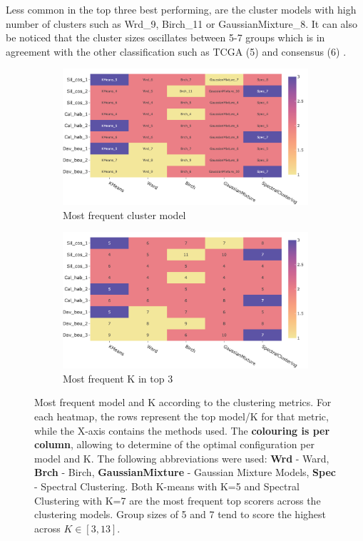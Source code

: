 Less common in the top three best performing, are the cluster models with high number of clusters such as Wrd\_9, Birch\_11 or GaussianMixture\_8. It can also be noticed that the cluster sizes oscillates between 5-7 groups which is in agreement with the other classification such as TCGA (5) and consensus (6) \citep{Robertson2017-mg,Kamoun2020-tj}.

\begin{figure}[!t]
    \centering
    \small
    \begin{subfigure}[!t]{0.8\textwidth}
        \includegraphics[width=\textwidth]{Sections/ClusteringAnalysis/Resources/cs_top3/top3_cs_gen_top3_heatmap_pca.png}
        \caption{Most frequent cluster model}
        \label{fig:cs:heatmap_gen}
    \end{subfigure}
    \centering
    \begin{subfigure}[!t]{0.8\textwidth}
        \includegraphics[width=\textwidth]{Sections/ClusteringAnalysis/Resources/cs_top3/top3_cs_size_top3_heatmap_pca.png}
        \caption{Most frequent K in top 3}
        \label{fig:cs:heatmap_cs}
    \end{subfigure}
    \caption[Heatmaps: most common cluster model and $K$]{Most frequent model and K according to the clustering metrics. For each heatmap, the rows represent the top model/K for that metric, while the X-axis contains the methods used. The \textbf{colouring is per column}, allowing to determine of the optimal configuration per model and K. The following abbreviations were used: \textbf{Wrd} - Ward, \textbf{Brch} - Birch, \textbf{GaussianMixture} - Gaussian Mixture Models, \textbf{Spec} - Spectral Clustering. Both K-means with K=5 and Spectral Clustering with K=7 are the most frequent top scorers across the clustering models. Group sizes of 5 and 7 tend to score the highest across $K\in[3,13]$.}

\end{figure}
